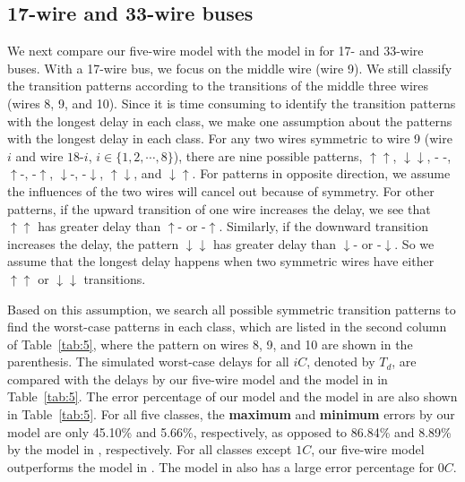 \documentclass[10pt,journal]{IEEEtran}
\begin{document}
\subsection{17-wire and 33-wire buses}
We next compare our five-wire model with the model in \cite{Sot01} for 17- and 33-wire buses. With a 17-wire bus, we focus on the middle wire (wire 9). We still classify the transition patterns according to the transitions of the middle three wires (wires 8, 9, and 10).
Since it is time consuming to identify the transition patterns with the longest delay in each class, we make one assumption about the patterns with the longest delay in each class. For any two wires symmetric to wire 9 (wire $i$ and wire $18$-$i$, $i \in \{1,2,\cdots, 8\}$), there are nine possible patterns, $\uparrow \uparrow$, $\downarrow \downarrow$, - -, $\uparrow$-, -$\uparrow$, $\downarrow$-, -$\downarrow$, $\uparrow \downarrow$, and $\downarrow \uparrow$. For patterns in opposite direction, we assume the influences of the two wires will cancel out because of symmetry. For other patterns, if the upward transition of one wire increases the delay, we see that $\uparrow \uparrow$ has greater delay than $\uparrow$- or -$\uparrow$. Similarly, if the downward transition increases the delay, the pattern $\downarrow \downarrow$ has greater delay than $\downarrow$- or -$\downarrow$. So we assume that the longest delay happens when two symmetric wires have either $\uparrow \uparrow$ or $\downarrow \downarrow$ transitions.

Based on this assumption, we search all possible symmetric transition patterns to find the worst-case patterns in each class, which
are listed in the second column of Table~\ref{tab:5}, where the pattern on wires 8, 9, and 10 are shown in the parenthesis. The simulated worst-case delays for all $iC$, denoted by $T_d$, are compared with the delays by our five-wire model and the model in \cite{Sot01} in Table~\ref{tab:5}. The error percentage of our model and the model in \cite{Sot01}  are also shown in Table~\ref{tab:5}. For all five classes, the \textbf{maximum} and \textbf{minimum} errors by our model are only 45.10\% and 5.66\%, respectively, as opposed to 86.84\% and 8.89\% by the model in \cite{Sot01}, respectively. For all classes except $1C$, our five-wire model outperforms the model in \cite{Sot01}. The model in \cite{Sot01} also has a large error percentage for $0C$.
\end{document}
